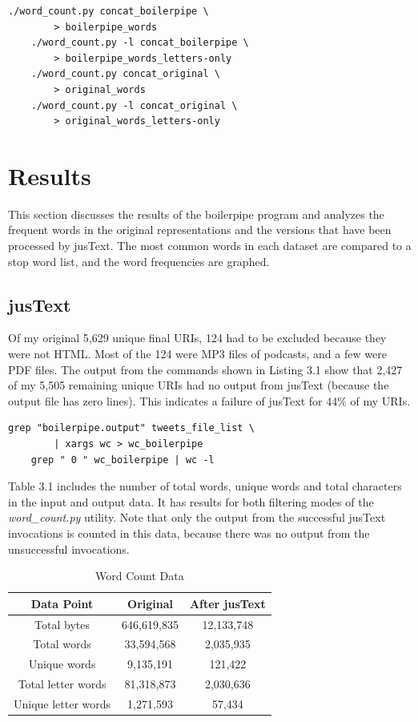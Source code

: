 \documentclass[a4paper,12pt]{article}
\begin{document}
\begin{lstlisting}[basicstyle=\ttfamily,caption={Counting words in concatenated data}]
    ./word_count.py concat_boilerpipe \
        > boilerpipe_words
    ./word_count.py -l concat_boilerpipe \
        > boilerpipe_words_letters-only
    ./word_count.py concat_original \
        > original_words
    ./word_count.py -l concat_original \
        > original_words_letters-only
\end{lstlisting}

\section{Results}
This section discusses the results of the boilerpipe program and analyzes the frequent words in the original
representations and the versions that have been processed by jusText. The most common words in each dataset
are compared to a stop word list, and the word frequencies are graphed.

\subsection{jusText}
Of my original 5,629 unique final URIs, 124 had to be excluded because they were not HTML. Most of the 124 were
MP3 files of podcasts, and a few were PDF files. The output from the commands shown in Listing 3.1 show that
2,427 of my 5,505 remaining unique URIs had no output from jusText (because the output file has zero lines).
This indicates a failure of jusText for 44\% of my URIs.

\begin{lstlisting}[basicstyle=\ttfamily,caption={Counting failed jusText runs}]
    grep "boilerpipe.output" tweets_file_list \
        | xargs wc > wc_boilerpipe
    grep " 0 " wc_boilerpipe | wc -l
\end{lstlisting}

Table 3.1 includes the number of total words, unique words and total characters in the input and
output data. It has results for both filtering modes of the \emph{word\_count.py} utility. Note that only the
output from the successful jusText invocations is counted in this data, because there was no output from the
unsuccessful invocations.

\begin{table}[H]
\centering
\caption{Word Count Data}
\begin{tabular}{ | c | c | c | }
\hline
\textbf{Data Point}  & \textbf{Original} & \textbf{After jusText} \\ \hline
Total bytes          & 646,619,835  & 12,133,748    \\ \hline
Total words          & 33,594,568   & 2,035,935     \\ \hline
Unique words         & 9,135,191    & 121,422       \\ \hline
Total letter words   & 81,318,873   & 2,030,636     \\ \hline
Unique letter words  & 1,271,593    & 57,434        \\ \hline
\end{tabular}
\end{table}
\end{document}
